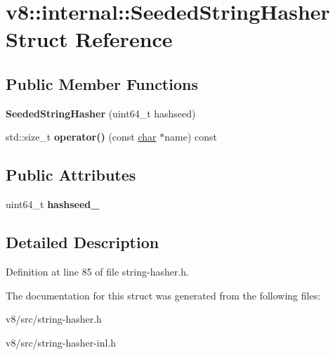 \hypertarget{structv8_1_1internal_1_1SeededStringHasher}{}\section{v8\+:\+:internal\+:\+:Seeded\+String\+Hasher Struct Reference}
\label{structv8_1_1internal_1_1SeededStringHasher}
\subsection*{Public Member Functions}
\begin{DoxyCompactItemize}
\item 
\mbox{\label{structv8_1_1internal_1_1SeededStringHasher_a176deef6c4e79f87006ad07492cd6b5e}} 
{\bfseries Seeded\+String\+Hasher} (uint64\+\_\+t hashseed)
\item 
\mbox{\label{structv8_1_1internal_1_1SeededStringHasher_a61e940ae636e2e5db97b9dd59869e294}} 
std\+::size\+\_\+t {\bfseries operator()} (const \mbox{\hyperlink{classchar}{char}} $\ast$name) const
\end{DoxyCompactItemize}
\subsection*{Public Attributes}
\begin{DoxyCompactItemize}
\item 
\mbox{\label{structv8_1_1internal_1_1SeededStringHasher_abbe7b2aff77502cde2b8f62a7b7072d6}} 
uint64\+\_\+t {\bfseries hashseed\+\_\+}
\end{DoxyCompactItemize}


\subsection{Detailed Description}


Definition at line 85 of file string-\/hasher.\+h.



The documentation for this struct was generated from the following files\+:\begin{DoxyCompactItemize}
\item 
v8/src/string-\/hasher.\+h\item 
v8/src/string-\/hasher-\/inl.\+h\end{DoxyCompactItemize}
